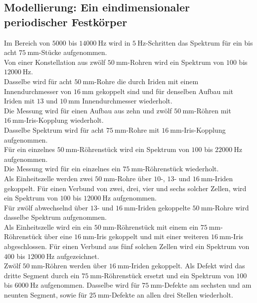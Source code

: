 \subsection{Modellierung: Ein eindimensionaler periodischer Festkörper}
Im Bereich von  $5000$ bis $\SI{14000}{\hertz}$ wird in $\SI{5}{\hertz}$-Schritten das Spektrum für ein bis acht $\SI{75}{\milli\metre}$-Stücke aufgenommen.\\
Von einer Konstellation aus zwölf $\SI{50}{\milli\metre}$-Rohren wird ein Spektrum von $100$ bis $\SI{12000}{\hertz}$.\\
Dasselbe wird für acht $\SI{50}{\milli\metre}$-Rohre die durch Iriden mit einem Innendurchmesser von $\SI{16}{\milli\metre}$ gekoppelt sind und für denselben Aufbau mit Iriden mit $13$ und $\SI{10}{\milli\metre}$ Innendurchmesser wiederholt.\\
Die Messung wird für einen Aufbau aus zehn und zwölf $\SI{50}{\milli\metre}$-Röhren mit $\SI{16}{\milli\metre}$-Iris-Kopplung wiederholt. \\
Dasselbe Spektrum wird für acht $\SI{75}{\milli\metre}$-Rohre mit $\SI{16}{\milli\metre}$-Iris-Kopplung aufgenommen.\\
Für ein einzelnes $\SI{50}{\milli\metre}$-Röhrenstück wird ein Spektrum von $100$ bis $\SI{22000}{\hertz}$ aufgenommen.\\
Die Messung wird für ein einzelnes ein $\SI{75}{\milli\metre}$-Röhrenstück wiederholt.\\
Als Einheitszelle werden zwei $\SI{50}{\milli\metre}$-Rohre über $10$-, $13$- und $\SI{16}{\milli\metre}$-Iriden gekoppelt.
Für einen Verbund von zwei, drei, vier und sechs solcher Zellen, wird ein Spektrum von $100$ bis $\SI{12000}{\hertz}$ aufgenommen.\\
Für zwölf abwechselnd über $13$- und $\SI{16}{\milli\metre}$-Iriden gekoppelte $\SI{50}{\milli\metre}$-Rohre wird dasselbe Spektrum aufgenommen.\\
Als Einheitszelle wird ein ein $\SI{50}{\milli\metre}$-Röhrenstück mit einem ein $\SI{75}{\milli\metre}$-Röhrenstück über eine $\SI{16}{\milli\metre}$-Iris gekoppelt und mit einer weiteren $\SI{16}{\milli\metre}$-Iris abgeschlossen.
Für einen Verbund aus fünf solchen Zellen wird ein Spektrum von $400$ bis $\SI{12000}{\hertz}$ aufgezeichnet.\\
Zwölf $\SI{50}{\milli\metre}$-Röhren werden über $\SI{16}{\milli\metre}$-Iriden gekoppelt.
Als Defekt wird das dritte Segment durch ein $\SI{75}{\milli\metre}$-Röhrenstück ersetzt und ein Spektrum von $100$ bis $\SI{6000}{\hertz}$ aufgenommen.
Dasselbe wird für $\SI{75}{\milli\metre}$-Defekte am sechsten und am neunten Segment, sowie für $\SI{25}{\milli\metre}$-Defekte an allen drei Stellen wiederholt.

